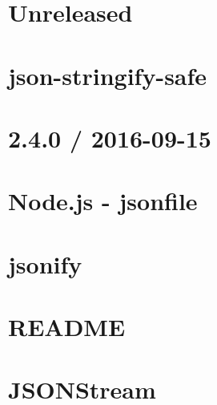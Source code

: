 \documentclass[twoside]{book}
\newcommand{\+}{\discretionary{\mbox{\scriptsize$\hookleftarrow$}}{}{}}
\begin{document}
\chapter{Unreleased}
\label{md_dsmacc_examples_DRmerge_node_modules_json-stringify-safe_CHANGELOG}

\chapter{json-\/stringify-\/safe}
\label{md_dsmacc_examples_DRmerge_node_modules_json-stringify-safe_README}

\chapter{2.4.0 / 2016-\/09-\/15}
\label{md_dsmacc_examples_DRmerge_node_modules_jsonfile_CHANGELOG}

\chapter{Node.\+js -\/ jsonfile}
\label{md_dsmacc_examples_DRmerge_node_modules_jsonfile_README}

\chapter{jsonify}
\label{md_dsmacc_examples_DRmerge_node_modules_jsonify_README}

\chapter{R\+E\+A\+D\+ME}
\label{md_dsmacc_examples_DRmerge_node_modules_jsonparse_README}

\chapter{J\+S\+O\+N\+Stream}
\label{md_dsmacc_examples_DRmerge_node_modules_JSONStream_readme}

\end{document}
